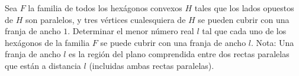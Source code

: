 Sea $F$ la familia de todos los hexágonos convexos $H$ tales que los lados opuestos de $H$ son paralelos, y tres vértices cualesquiera de $H$ se pueden cubrir con una franja de ancho $1$.
Determinar el menor número real $l$ tal que cada uno de los hexágonos de la familia $F$ se puede cubrir con una franja de ancho $l$. \newline 
Nota: Una franja de ancho $l$ es la región del plano comprendida entre dos rectas paralelas que están a distancia $l$ (incluidas ambas rectas paralelas).

